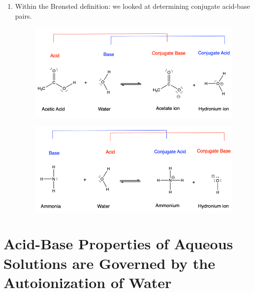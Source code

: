 \documentclass[12pt]{article}
\begin{document}
\begin{enumerate}
    \newpage 
    
    \item Within the Brønsted definition: we looked at determining conjugate acid-base pairs.
    \vspace{2cm}

    \begin{figure}[h] 
	\begin{centering}
		\includegraphics[width=\textwidth,trim={0 0 0 5cm},clip]{Figures/Conj-A-B-pairs-1.png}
	\end{centering}
    \end{figure}    

    \vspace{2cm}

     \begin{figure}[h] 
	\begin{centering}
		\includegraphics[width=\textwidth,trim={0 0 0 5cm},clip]{Figures/Conj-A-B-pairs-2.png}
	\end{centering}
    \end{figure}    
    
\end{enumerate}

\newpage

\section{Acid-Base Properties of Aqueous Solutions are Governed by the Autoionization of Water}
\end{document}
